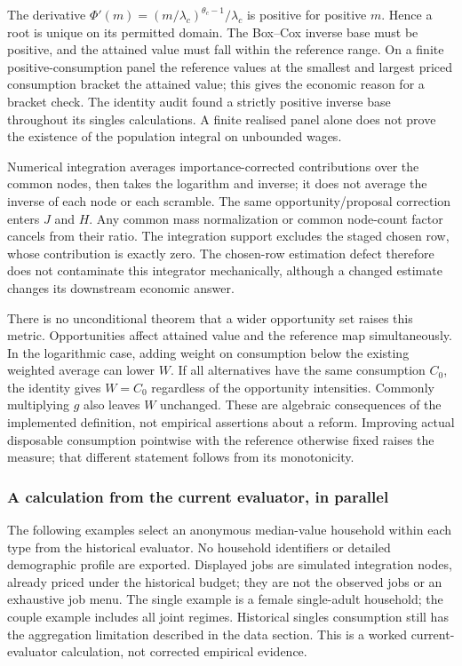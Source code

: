 \documentclass[11pt,a4paper]{article}
\begin{document}
The derivative \(\Phi'(m)=(m/\lambda_c)^{\theta_c-1}/\lambda_c\) is positive for positive \(m\). Hence a root is unique on its permitted domain. The Box--Cox inverse base must be positive, and the attained value must fall within the reference range. On a finite positive-consumption panel the reference values at the smallest and largest priced consumption bracket the attained value; this gives the economic reason for a bracket check. The identity audit found a strictly positive inverse base throughout its singles calculations. A finite realised panel alone does not prove the existence of the population integral on unbounded wages.

Numerical integration averages importance-corrected contributions over the common nodes, then takes the logarithm and inverse; it does not average the inverse of each node or each scramble. The same opportunity/proposal correction enters \(J\) and \(H\). Any common mass normalization or common node-count factor cancels from their ratio. The integration support excludes the staged chosen row, whose contribution is exactly zero. The chosen-row estimation defect therefore does not contaminate this integrator mechanically, although a changed estimate changes its downstream economic answer.

There is no unconditional theorem that a wider opportunity set raises this metric. Opportunities affect attained value and the reference map simultaneously. In the logarithmic case, adding weight on consumption below the existing weighted average can lower \(W\). If all alternatives have the same consumption \(C_0\), the identity gives \(W=C_0\) regardless of the opportunity intensities. Commonly multiplying \(g\) also leaves \(W\) unchanged. These are algebraic consequences of the implemented definition, not empirical assertions about a reform. Improving actual disposable consumption pointwise with the reference otherwise fixed raises the measure; that different statement follows from its monotonicity.

\subsubsection{A calculation from the current evaluator, in parallel}\label{a-calculation-from-the-current-evaluator-in-parallel}

The following examples select an anonymous median-value household within each type from the historical evaluator. No household identifiers or detailed demographic profile are exported. Displayed jobs are simulated integration nodes, already priced under the historical budget; they are not the observed jobs or an exhaustive job menu. The single example is a female single-adult household; the couple example includes all joint regimes. Historical singles consumption still has the aggregation limitation described in the data section. This is a worked current-evaluator calculation, not corrected empirical evidence.
\end{document}
